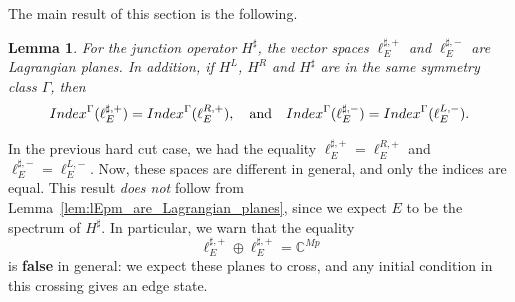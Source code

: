 \documentclass[11pt]{amsart}
\numberwithin{equation}{section} %
\newtheorem{lemma}[theorem]{Lemma}
\newcommand\1{{\mathds 1}}
\def\C{{\mathbb C}}
\def\Index{{\rm Index}}
\begin{document}
\medskip

The main result of this section is the following. 
\begin{lemma}\label{lem:continuous_junction}
    For the junction operator $H^\sharp$, the vector spaces $\ell_E^{\sharp, +}$ and $\ell_E^{\sharp, -}$ are Lagrangian planes. In addition, if $H^L$, $H^R$ and $H^\sharp$ are in the same symmetry class $\Gamma$, then
    \[
        \Index^\Gamma(\ell_E^{\sharp, +}) = \Index^\Gamma(\ell_E^{R, +}), \quad \text{and} \quad
        \Index^\Gamma(\ell_E^{\sharp, -}) = \Index^\Gamma(\ell_E^{L, -}).
    \]
\end{lemma}
In the previous hard cut case, we had the equality $\ell^{\sharp, +}_E = \ell^{R, +}_E$ and  $\ell^{\sharp, -}_E = \ell^{L, -}_E$. Now, these spaces are different in general, and only the indices are equal. This result {\em does not} follow from Lemma~\ref{lem:lEpm_are_Lagrangian_planes}, since we expect $E$ to be the spectrum of $H^\sharp$. In particular, we warn that the equality
\[
    \ell_E^{\sharp, +} \oplus \ell_E^{\sharp, +} = \C^{Mp}
\]
is {\bf false} in general: we expect these planes to cross, and any initial condition in this crossing gives an edge state. 
\end{document}

